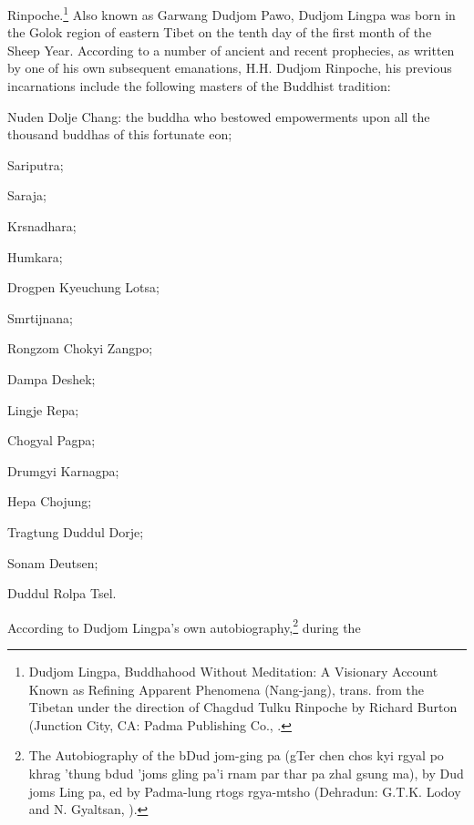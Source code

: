 \documentclass[a4paper,11pt,twoside,final]{book}
\begin{document}
Rinpoche.\footnote{Dudjom Lingpa, Buddhahood Without Meditation: A
  Visionary Account Known as Refining Apparent Phenomena (Nang-jang),
  trans. from the Tibetan under the direction of Chagdud Tulku
  Rinpoche by Richard Burton (Junction City, CA: Padma Publishing Co.,
  .} Also known as Garwang Dudjom Pawo, Dudjom
Lingpa was born in the Golok region of eastern Tibet on the tenth day
of the first month of the Sheep Year. According to a number of ancient
and recent prophecies, as written by one of his own subsequent
emanations, H.H. Dudjom Rinpoche, his previous incarnations include
the following masters of the Buddhist tradition:
\begin{enumerate*}

  \item Nuden Dolje Chang: the buddha who bestowed empowerments upon all
    the thousand buddhas of this fortunate eon;

  \item Sariputra;

  \item Saraja;

  \item Krsnadhara;

  \item Humkara;

  \item Drogpen Kyeuchung Lotsa;

  \item Smrtijnana;

  \item Rongzom Chokyi Zangpo;

  \item Dampa Deshek;

  \item Lingje Repa;

  \item Chogyal Pagpa;

  \item Drumgyi Karnagpa;

  \item Hepa Chojung;

  \item Tragtung Duddul Dorje;

  \item Sonam Deutsen;

  \item Duddul Rolpa Tsel.

\end{enumerate*}
According to Dudjom Lingpa's own autobiography,\footnote{The
  Autobiography of the bDud jom-ging pa (gTer chen chos kyi rgyal po
  khrag 'thung bdud 'joms gling pa'i rnam par thar pa zhal gsung ma),
  by Dud joms Ling pa, ed by Padma-lung rtogs rgya-mtsho (Dehradun:
  G.T.K. Lodoy and N. Gyaltsan, ).} during the
\end{document}
